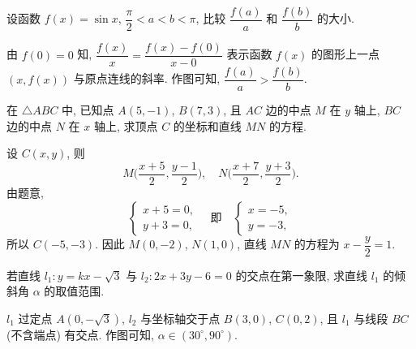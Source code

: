 \begin{exercise}
    设函数 $f(x)= \sin x$, $\dfrac\pi2< a< b< \pi$, 比较 $\dfrac{f(a)}a$ 和 $\dfrac{f(b)}b$ 的大小.
\end{exercise}
\beginsolution
    由 $f(0)=0$ 知, $\dfrac{f(x)}x= \dfrac{f(x)- f(0)}{x- 0}$ 表示函数 $f(x)$ 的图形上一点 $(x,f(x))$ 与原点连线的斜率. 作图可知, $\dfrac{f(a)}a> \dfrac{f(b)}b$.
\endsolution

\begin{exercise}
    在 $\triangle ABC$ 中, 已知点 $A(5, -1)$, $B(7, 3)$, 且 $AC$ 边的中点 $M$ 在 $y$ 轴上, $BC$ 边的中点 $N$ 在 $x$ 轴上, 求顶点 $C$ 的坐标和直线 $MN$ 的方程.
\end{exercise}
\beginsolution
    设 $C(x,y)$, 则
    \[M\biggl(\frac{x+5}2, \frac{y-1}2\biggr),\quad
    N\biggl(\frac{x+7}2, \frac{y+3}2\biggr).\]
    由题意,
    \[\left\{\!\!\begin{array}{l}
        x+5=0,\\
        y+3=0,
    \end{array}\right.\quad\text{即}\quad
    \left\{\!\!\begin{array}{l}
        x=-5,\\
        y=-3,
    \end{array}\right.\]
    所以 $C(-5,-3)$. 因此 $M(0,-2)$, $N(1,0)$, 直线 $MN$ 的方程为 $x- \dfrac{y}2= 1$.
\endsolution

\begin{exercise}
    若直线 $l_1 \colon y=kx-\sqrt3$ 与 $l_2 \colon 2x+3y-6=0$ 的交点在第一象限, 求直线 $l_1$ 的倾斜角 $\alpha$ 的取值范围.
\end{exercise}
\beginsolution
    $l_1$ 过定点 $A(0,-\sqrt3)$, $l_2$ 与坐标轴交于点 $B(3,0)$, $C(0,2)$, 且 $l_1$ 与线段 $BC$ (不含端点) 有交点. 作图可知, $\alpha\in(30^\circ,90^\circ)$.
\endsolution